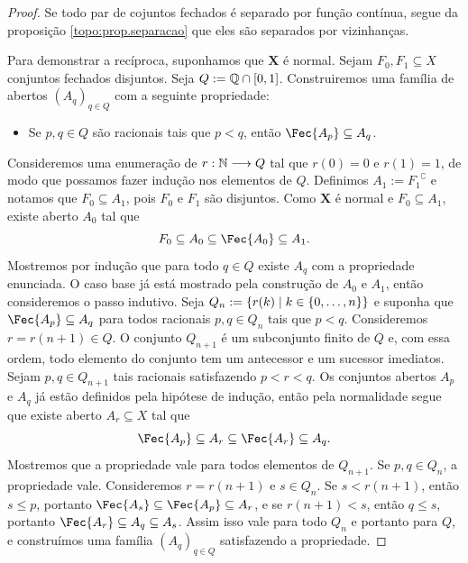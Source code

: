 \begin{proof}
Se todo par de cojuntos fechados é separado por função contínua, segue da proposição \ref{topo:prop.separacao} que eles são separados por vizinhanças.

Para demonstrar a recíproca, suponhamos que $\bm X$ é normal. Sejam $F_0,F_1 \subseteq X$ conjuntos fechados disjuntos. Seja $Q := \mathbb{Q} \cap \left[0,1\right]$. Construiremos uma família de abertos $(A_q)_{q \in Q}$ com a seguinte propriedade:
	\begin{itemize}
	\item Se $p,q \in Q$ são racionais tais que $p<q$, então $\Fec{A_p} \subseteq A_q$.
	\end{itemize}

Consideremos uma enumeração de $r: \mathbb{N} \longrightarrow Q$ tal que $r(0)=0$ e $r(1)=1$, de modo que possamos fazer indução nos elementos de $Q$. Definimos $A_1:={F_1}^\complement$ e notamos que $F_0 \subseteq A_1$, pois $F_0$ e $F_1$ são disjuntos. Como $\bm X$ é normal e $F_0 \subseteq A_1$, existe aberto $A_0$ tal que
	\begin{equation*}
	F_0 \subseteq A_0 \subseteq \Fec{A_0} \subseteq A_1.
	\end{equation*}
Mostremos por indução que para todo $q \in Q$ existe $A_q$ com a propriedade enunciada. O caso base já está mostrado pela construção de $A_0$ e $A_1$, então consideremos o passo indutivo. Seja $Q_n := \left\{r(k) \;\middle\vert\; k \in \{0,\ldots,n\} \right\}$ e suponha que $\Fec{A_p} \subseteq A_q$ para todos racionais $p,q \in Q_n$ tais que $p<q$. Consideremos $r=r(n+1) \in Q$. O conjunto $Q_{n+1}$ é um subconjunto finito de $Q$ e, com essa ordem, todo elemento do conjunto tem um antecessor e um sucessor imediatos. Sejam $p,q \in Q_{n+1}$ tais racionais satisfazendo $p<r<q$. Os conjuntos abertos $A_p$ e $A_q$ já estão definidos pela hipótese de indução, então pela normalidade segue que existe aberto $A_r \subseteq X$ tal que
	\begin{equation*}
	\Fec{A_p} \subseteq A_r \subseteq \Fec{A_r} \subseteq A_q.
	\end{equation*}
Mostremos que a propriedade vale para todos elementos de $Q_{n+1}$. Se $p,q \in Q_n$, a propriedade vale. Consideremos $r=r(n+1)$ e $s \in Q_n$. Se $s<r(n+1)$, então $s \leq p$, portanto $\Fec{A_s} \subseteq \Fec{A_p} \subseteq A_r$, e se $r(n+1) < s$, então $q \leq s$, portanto $\Fec{A_r} \subseteq A_q \subseteq A_s$. Assim isso vale para todo $Q_n$ e portanto para $Q$, e construímos uma família $(A_q)_{q \in Q}$ satisfazendo a propriedade.


\end{proof}
